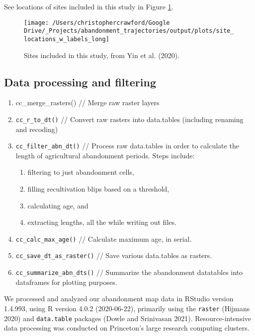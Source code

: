 \documentclass[
]{article}
\providecommand{\tightlist}{%
  \setlength{\itemsep}{0pt}\setlength{\parskip}{0pt}}
\begin{document}
See locations of sites included in this study in Figure \ref{fig:site-locations}.



\begin{figure}
\texttt{[image: /Users/christophercrawford/Google Drive/\_Projects/abandonment\_trajectories/output/plots/site\_locations\_w\_labels\_long]} \caption{Sites included in this study, from Yin et al. (2020).}\label{fig:site-locations}
\end{figure}

\hypertarget{data-processing-and-filtering}{%
\subsection{Data processing and filtering}\label{data-processing-and-filtering}}

\begin{enumerate}
\def\labelenumi{\arabic{enumi}.}
\setcounter{enumi}{-1}
\tightlist
\item
  cc\_merge\_rasters() // Merge raw raster layers
\item
  \texttt{cc\_r\_to\_dt()} // Convert raw rasters into data.tables (including renaming and recoding)
\item
  \texttt{cc\_filter\_abn\_dt()} // Process raw data.tables in order to calculate the length of agricultural abandonment periods. Steps include:

  \begin{enumerate}
  \def\labelenumii{\alph{enumii}.}
  \tightlist
  \item
    filtering to just abandonment cells,
  \item
    filling recultivation blips based on a threshold,
  \item
    calculating age, and
  \item
    extracting lengths, all the while writing out files.
  \end{enumerate}
\item
  \texttt{cc\_calc\_max\_age()} // Calculate maximum age, in serial.
\item
  \texttt{cc\_save\_dt\_as\_raster()} // Save various data.tables as rasters.
\item
  \texttt{cc\_summarize\_abn\_dts()} // Summarize the abandonment datatables into dataframes for plotting purposes.
\end{enumerate}

We processed and analyzed our abandonment map data in RStudio version 1.4.993, using R version 4.0.2 (2020-06-22), primarily using the \texttt{raster} (Hijmans 2020) and \texttt{data.table} packages (Dowle and Srinivasan 2021).
Resource-intensive data processing was conducted on Princeton's large research computing clusters.
\end{document}

